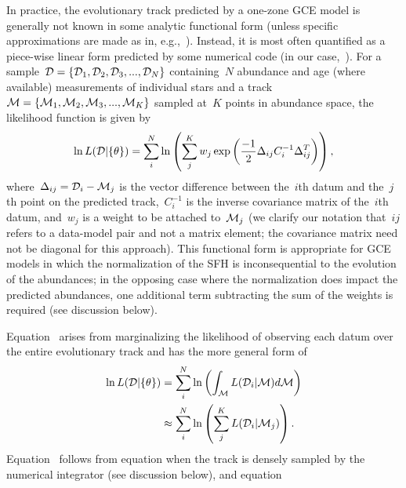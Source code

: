 \documentclass[foo.tex]{subfiles}
\begin{document}
In practice, the evolutionary track predicted by a one-zone GCE model is
generally not known in some analytic functional form (unless specific
approximations are made as in, e.g.,~\citealp{Weinberg2017}).
Instead, it is most often quantified as a piece-wise linear form predicted by
some numerical code (in our case,~\vice).
For a sample~$\mathcal{D} = \{\mathcal{D}_1, \mathcal{D}_2, \mathcal{D}_3, ...,
\mathcal{D}_N\}$ containing~$N$ abundance and age (where available) measurements
of individual stars and a track~$\mathcal{M} = \{\mathcal{M}_1, \mathcal{M}_2,
\mathcal{M}_3, ..., \mathcal{M}_K\}$ sampled at~$K$ points in abundance space,
the likelihood function is given by
\begin{equation}
\ln L(\mathcal{D} | \{\theta\}) = \sum_i^N \ln \left(
\sum_j^K w_j \exp\left(
\frac{-1}{2}\Delta_{ij}C_i^{-1}\Delta_{ij}^T
\right)
\right),
\label{eq:likelihood}
\end{equation}
where~$\Delta_{ij} = \mathcal{D}_i - \mathcal{M}_j$ is the vector difference
between the~$i$th datum and the~$j$th point on the predicted track,~$C_i^{-1}$
is the inverse covariance matrix of the~$i$th datum, and~$w_j$ is a weight to
be attached to~$\mathcal{M}_j$ (we clarify our notation that~$ij$ refers to a
data-model pair and not a matrix element; the covariance matrix need not be
diagonal for this approach).
This functional form is appropriate for GCE models in which the normalization
of the SFH is inconsequential to the evolution of the abundances; in the
opposing case where the normalization does impact the predicted abundances,
one additional term subtracting the sum of the weights is required (see
discussion below).
\par
Equation~ arises from marginalizing the likelihood of
observing each datum over the entire evolutionary track and has the more
general form of
\begin{subequations}\begin{align}
\ln L(\mathcal{D} | \{\theta\}) &= \sum_i^N \ln \left(
\int_{\mathcal{M}} L(\mathcal{D}_i | \mathcal{M}) d\mathcal{M}
\right)
\label{eq:likelihood_general_int}
\\
&\approx \sum_i^N \ln \left(
\sum_j^K L(\mathcal{D}_i | \mathcal{M}_j)\right).
\label{eq:likelihood_general}
\end{align}\end{subequations}
Equation~ follows from equation
 when the track is densely sampled by the
numerical integrator (see discussion below), and equation~
\end{document}

